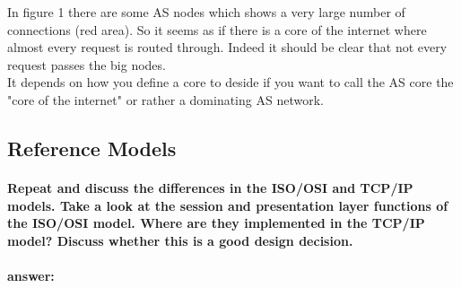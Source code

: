 \documentclass[a4paper,12pt]{article}
\begin{document}
In figure 1 there are some AS nodes which shows a very large number of connections (red area). So it seems as if there is a core of the internet where almost every request is routed through.
Indeed it should be clear that not every request passes the big nodes. \\
It depends on how you define a core to deside if you want to call the AS core the "core of the internet" or rather a dominating AS network. 


 
 \subsection{Reference Models}
 \paragraph{Repeat and discuss the differences in the ISO/OSI and TCP/IP models. Take a look at the session and presentation layer functions of the ISO/OSI model. Where are they implemented in the TCP/IP model? Discuss whether this is a good design decision. }
 \paragraph{answer:}
 
\end{document}
